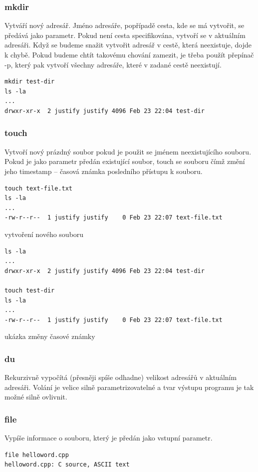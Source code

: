 \documentclass{article}
\begin{document}
\subsubsection{mkdir}
Vytváří nový adresář. Jméno adresáře, popřípadě cesta, kde se má vytvořit, se předává jako parametr. Pokud není cesta specifikována, vytvoří se v aktuálním adresáři. Když se budeme snažit vytvořit adresář v cestě, která neexistuje, dojde k chybě. Pokud budeme chtít takovému chování zamezit, je třeba použít přepínač -p, který pak vytvoří všechny adresáře, které v zadané cestě neexistují.
\begin{verbatim}
mkdir test-dir
ls -la
...
drwxr-xr-x  2 justify justify 4096 Feb 23 22:04 test-dir
\end{verbatim}

\subsubsection{touch}
Vytvoří nový prázdný soubor pokud je použit se jménem neexistujícího souboru. Pokud je jako parametr předán existující soubor, touch se souboru  čímž změní jeho timestamp -- časová známka posledního přístupu k souboru.
\begin{verbatim}
touch text-file.txt
ls -la
...
-rw-r--r--  1 justify justify    0 Feb 23 22:07 text-file.txt
\end{verbatim}
vytvoření nového souboru

\begin{verbatim}
ls -la
...
drwxr-xr-x  2 justify justify 4096 Feb 23 22:04 test-dir

touch test-dir
ls -la
...
-rw-r--r--  1 justify justify    0 Feb 23 22:07 text-file.txt
\end{verbatim}
ukázka změny časové známky

\subsubsection{du}
Rekurzivně vypočítá (přesněji spíše odhadne) velikost adresářů v aktuálním adresáři. Volání je velice silně parametrizovatelné a tvar výstupu programu je tak možné silně ovlivnit.

\subsubsection{file}
Vypíše informace o souboru, který je předán jako vstupní parametr.
\begin{verbatim}
file helloword.cpp
helloword.cpp: C source, ASCII text
\end{verbatim}
\end{document}
